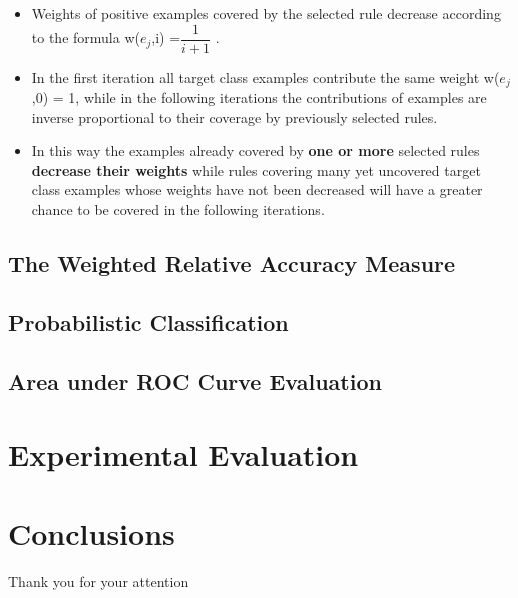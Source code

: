 \documentclass{beamer}
\begin{document}
\begin{CJK*}{UTF8}{bsmi}
\begin{frame}
	\begin{block}{}
		\begin{itemize}
			\item Weights of positive examples covered by the selected rule decrease according to the formula w($ e_{j}  $,i) =$  \dfrac{1}{i + 1} $ .
			\item In the first iteration all target class examples contribute the same weight w($ e_{j}  $,0) = 1, while in the following iterations the contributions of examples are inverse proportional to their coverage by previously selected rules. 
			\item In this way the examples already covered by\textbf{ one or more} selected rules\textbf{ decrease their weights }while rules covering many yet uncovered target class examples whose weights have not been decreased will have a greater chance to be covered in the following iterations.
		\end{itemize}
	\end{block}
\end{frame}
\subsection{The Weighted Relative Accuracy Measure}

\subsection{Probabilistic Classification}
\subsection{Area under ROC Curve Evaluation}

\section{ Experimental Evaluation } 


\section{Conclusions} 



\begin{frame}
\Huge{\centerline{Thank you for your attention}}
\end{frame}


\clearpage\end{CJK*}
\end{document}
